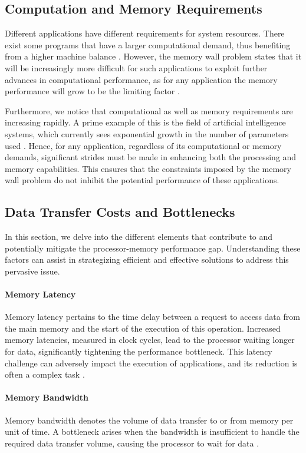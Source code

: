 \subsection{Computation and Memory Requirements}\label{sec:comp_mem_req}
Different applications have different requirements for system resources. There exist some programs that have a larger computational demand, thus benefiting from a higher machine balance \cite{mccalpin2016memory}. However, the memory wall problem states that it will be increasingly more difficult for such applications to exploit further advances in computational performance, as for any application the memory performance will grow to be the limiting factor \cite{wulf1995hitting, mckee2004reflections}.

Furthermore, we notice that computational as well as memory requirements are increasing rapidly. A prime example of this is the field of artificial intelligence systems, which currently sees exponential growth in the number of parameters used \cite{ourworldindata2023ai}. Hence, for any application, regardless of its computational or memory demands, significant strides must be made in enhancing both the processing and memory capabilities. This ensures that the constraints imposed by the memory wall problem do not inhibit the potential performance of these applications.

\subsection{Data Transfer Costs and Bottlenecks}\label{sec:data_transfer}
In this section, we delve into the different elements that contribute to and potentially mitigate the processor-memory performance gap. Understanding these factors can assist in strategizing efficient and effective solutions to address this pervasive issue.

\paragraph*{Memory Latency} Memory latency pertains to the time delay between a request to access data from the main memory and the start of the execution of this operation. Increased memory latencies, measured in clock cycles, lead to the processor waiting longer for data, significantly tightening the performance bottleneck. This latency challenge can adversely impact the execution of applications, and its reduction is often a complex task \cite{machanick2002approaches}.
\paragraph*{Memory Bandwidth} Memory bandwidth denotes the volume of data transfer to or from memory per unit of time. A bottleneck arises when the bandwidth is insufficient to handle the required data transfer volume, causing the processor to wait for data \cite{machanick2002approaches}.
